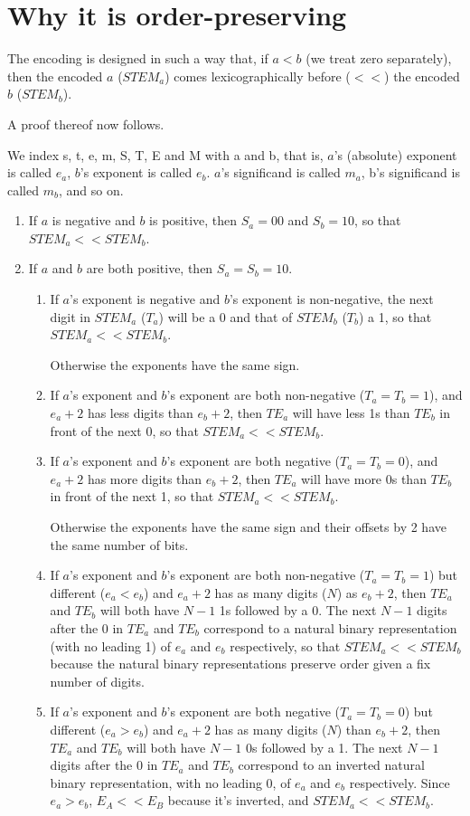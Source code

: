 \documentclass[final,leqno,onefignum,onetabnum]{siamltex1213}
\begin{document}
\section{Why it is order-preserving}
\label{section-proof}

The encoding is designed in such a way that, if $a < b$ (we treat zero separately), then the encoded $a$ ($STEM_a$) comes lexicographically before ($<<$) the encoded $b$ ($STEM_b$).

A proof thereof now follows.

We index s, t, e, m, S, T, E and M with a and b, that is, $a$'s (absolute) exponent is called $e_a$, $b$'s exponent is called $e_b$. $a$'s significand is called $m_a$, b's significand is called $m_b$, and so on.
 
\begin{enumerate}
\item If $a$ is negative and $b$ is positive, then $S_a=00$ and $S_b=10$, so that $STEM_a << STEM_b$.
\item If $a$ and $b$ are both positive, then $S_a=S_b=10$.
\begin{enumerate}
  \item If $a$'s exponent is negative and $b$'s exponent is non-negative, the next digit in $STEM_a$ ($T_a$) will be a 0 and that of $STEM_b$ ($T_b$) a 1, so that $STEM_a<< STEM_b$.

  Otherwise the exponents have the same sign.
  \item If $a$'s exponent and $b$'s exponent are both non-negative ($T_a=T_b=1$), and $e_a+2$ has less digits than $e_b+2$, then $TE_a$ will have less 1s than $TE_b$ in front of the next 0, so that $STEM_a << STEM_b$.
  \item If $a$'s exponent and $b$'s exponent are both negative ($T_a=T_b=0$), and $e_a+2$ has more digits than $e_b+2$, then $TE_a$ will have more 0s than $TE_b$ in front of the next 1, so that $STEM_a << STEM_b$.

  Otherwise the exponents have the same sign and their offsets by 2 have the same number of bits.
  \item If $a$'s exponent and $b$'s exponent are both non-negative ($T_a=T_b=1$) but different ($e_a < e_b$) and $e_a+2$ has as many digits ($N$) as $e_b+2$, then $TE_a$ and $TE_b$ will both have $N-1$ 1s followed by a 0. The next $N-1$ digits after the 0 in $TE_a$ and $TE_b$ correspond to a natural binary representation (with no leading 1) of $e_a$ and $e_b$ respectively, so that $STEM_a << STEM_b$ because the natural binary representations preserve order given a fix number of digits.
  \item If $a$'s exponent and $b$'s exponent are both negative ($T_a=T_b=0$) but different ($e_a > e_b$) and $e_a+2$ has as many digits ($N$) than $e_b+2$, then $TE_a$ and $TE_b$ will both have $N-1$ 0s followed by a 1. The next $N-1$ digits after the 0 in $TE_a$ and $TE_b$ correspond to an inverted natural binary representation, with no leading 0, of $e_a$ and $e_b$ respectively. Since $e_a > e_b$, $E_A << E_B$ because it's inverted, and $STEM_a << STEM_b$.


\end{enumerate}
\end{enumerate}
\end{document}
